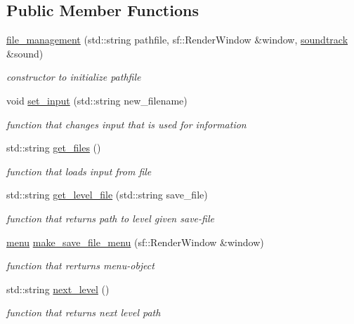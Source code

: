 \subsection*{Public Member Functions}
\begin{DoxyCompactItemize}
\item 
\hyperlink{classfile__management_a1c9de5c140a469a9d0f82970929f4a83}{file\+\_\+management} (std\+::string pathfile, sf\+::\+Render\+Window \&window, \hyperlink{classsoundtrack}{soundtrack} \&sound)
\begin{DoxyCompactList}\small\item\em constructor to initialize pathfile \end{DoxyCompactList}\item 
void \hyperlink{classfile__management_a090d9aba4dd5a795428ccbfe8d4037e6}{set\+\_\+input} (std\+::string new\+\_\+filename)
\begin{DoxyCompactList}\small\item\em function that changes input that is used for information \end{DoxyCompactList}\item 
std\+::string \hyperlink{classfile__management_a6c3f90ce958156adea878510097d64ef}{get\+\_\+files} ()
\begin{DoxyCompactList}\small\item\em function that loads input from file \end{DoxyCompactList}\item 
std\+::string \hyperlink{classfile__management_a58233800263bf74ae074a9a46f4a7bd0}{get\+\_\+level\+\_\+file} (std\+::string save\+\_\+file)
\begin{DoxyCompactList}\small\item\em function that returns path to level given save-\/file \end{DoxyCompactList}\item 
\hyperlink{classmenu}{menu} \hyperlink{classfile__management_a97eda13bca5dbe703663bf81f83a77a0}{make\+\_\+save\+\_\+file\+\_\+menu} (sf\+::\+Render\+Window \&window)
\begin{DoxyCompactList}\small\item\em function that rerturns menu-\/object \end{DoxyCompactList}\item 
std\+::string \hyperlink{classfile__management_a75689c420580c71f0621dfbcc4c2a06f}{next\+\_\+level} ()
\begin{DoxyCompactList}\small\item\em function that returns next level path \end{DoxyCompactList}\item 

\end{DoxyCompactItemize}
